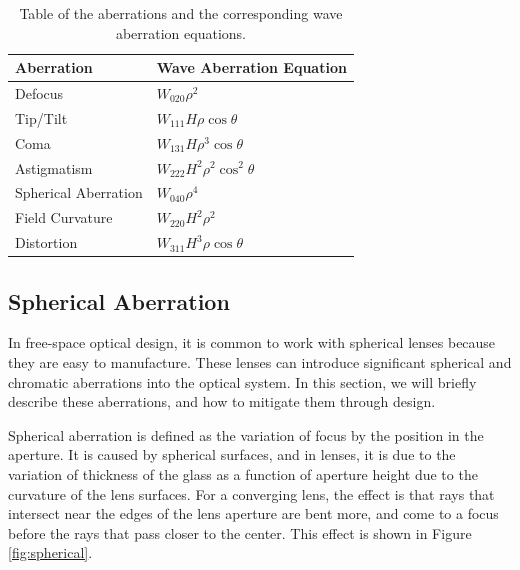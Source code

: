 \begin{table}
	\begin{center}
		\begin{tabular}{ | l| l | }
			\hline
			\textbf{Aberration}& \textbf{Wave Aberration Equation} \\ \hline
			Defocus & $W_{020}\rho^2$\\ \hline
			Tip/Tilt & $W_{111}H\rho \cos\theta$ \\ \hline
			Coma & $W_{131}H\rho^3\cos\theta$  \\ \hline
			Astigmatism & $W_{222}H^2\rho^2\cos^2\theta$  \\ \hline
			Spherical Aberration & $W_{040}\rho^4$ \\ \hline
			Field Curvature & $W_{220}H^2\rho^2$ \\ \hline
			Distortion & $W_{311}H^3 \rho \cos\theta$ \\ \hline
				
		\end{tabular}
	\end{center}
	\caption{Table of the aberrations and the corresponding wave aberration equations.}
	\label{tab:aberrations}
\end{table}



\subsection{Spherical Aberration}

In free-space optical design, it is common to work with spherical lenses because they are easy to manufacture. These lenses can introduce significant spherical and chromatic aberrations into the optical system. In this section, we will briefly describe these aberrations, and how to mitigate them through design.  

Spherical aberration is defined as the variation of focus by the position in the aperture. It is caused by spherical surfaces, and in lenses, it is due to the variation of thickness of the glass as a function of aperture height due to the curvature of the lens surfaces. For a converging lens, the effect is that rays that intersect near the edges of the lens aperture are bent more, and come to a focus before the rays that pass closer to the center. This effect is shown in Figure \ref{fig:spherical}. 

